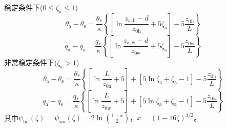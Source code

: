 稳定条件下($0\leqslant\zeta_{\mathrm{a}}\leqslant1$)
\begin{equation}
  \theta_{\mathrm{a}}-\theta_{\mathrm{s}}=\frac{\theta_{*}}{\kappa}\left\{\left[\ln \frac{z_{\mathrm{a, h}}-d}{z_{\mathrm{0 h}}}+5 \zeta_{\mathrm{a}}\right]-5 \frac{z_{\mathrm{0 h}}}{L}\right\}
\end{equation}
\begin{equation}
  q_{\mathrm{a}}-q_{\mathrm{s}}=\frac{q_{*}}{\kappa}\left\{\left[\ln \frac{z_{\mathrm{a, w}}-d}{z_{\mathrm{0 w}}}+5 \zeta_{\mathrm{a}}\right]-5 \frac{z_{\mathrm{0 w}}}{L}\right\}
\end{equation}
非常稳定条件下($\zeta_{\mathrm{a}}>1$)
\begin{equation}\label{theta_VS}
  \theta_{\mathrm{a}}-\theta_{\mathrm{s}}=\frac{\theta_{*}}{\kappa}\left\{\left[\ln \frac{L}{z_{\mathrm{0 h}}}+5\right]
  +\left[5 \ln \zeta_{\mathrm{a}}+\zeta_{\mathrm{a}}-1\right]-5 \frac{z_{\mathrm{0 h}}}{L}\right\}
\end{equation}
\begin{equation}\label{q_VS}
  q_{\mathrm{a}}-q_{\mathrm{s}}=\frac{q_{*}}{\kappa}\left\{\left[\ln \frac{L}{z_{\mathrm{0 w}}}+5\right]
  +\left[5 \ln \zeta_{\mathrm{a}}+\zeta_{\mathrm{a}}-1\right]-5 \frac{z_{\mathrm{0 w}}}{L}\right\}
\end{equation}
其中$\psi_{\mathrm{hu}}\left(\zeta\right)=\psi_{\mathrm{wu}}\left(\zeta\right)=2\ln{\left(\frac{1+x}{2}\right)}$，$x={(1-16\zeta)}^{1/2}$。

